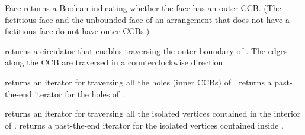 \begin{ccRefClass}{Face}
  {returns a Boolean indicating whether the face has an outer CCB.
   (The fictitious face and the unbounded face of an arrangement that
   does not have a fictitious face do not have outer CCBs.)}    

    {returns a circulator that enables traversing the outer boundary of
     \ccVar{}. The edges along the CCB are traversed in a counterclockwise
     direction.
     }
    
    {returns an iterator for traversing all the holes (inner CCBs) of
     \ccVar{}.}
\ccGlue
{}
    {returns a past-the-end iterator for the holes of \ccVar{}.}

    {returns an iterator for traversing all the isolated vertices
     contained in the interior of \ccVar{}.}
\ccGlue
{}
    {returns a past-the-end iterator for the isolated vertices 
     contained inside \ccVar{}.}

\end{ccRefClass}

\ccRefPageEnd
